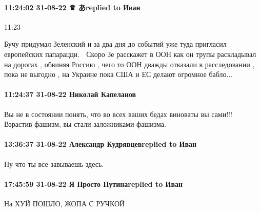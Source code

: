 \paragraph{11:24:02 31-08-22 ♛ あreplied to Иван}
11:23

Бучу придумал Зеленский и за два дня до событий уже туда пригласил европейских
папарацци. 🤣 Скоро Зе расскажет в ООН как он трупы раскладывал на дорогах ,
обвиняя Россию , чего то ООН дважды отказали в расследовании , пока не выгодно
, на Украине пока США и ЕС делают огромное бабло...

\paragraph{11:24:37 31-08-22 Николай Капеланов}

Вы не в состоянии понять, что во всех ваших бедах виноваты вы сами!!! Взрастив
фашизм, вы стали заложниками фашизма.

\paragraph{13:36:37 31-08-22 Александр Кудрявцевreplied to Иван}

Ну что ты все завываешь здесь.

\paragraph{17:45:59 31-08-22 Я Просто Путинаreplied to Иван}
На ХУЙ ПОШЛО, ЖОПА С РУЧКОЙ

